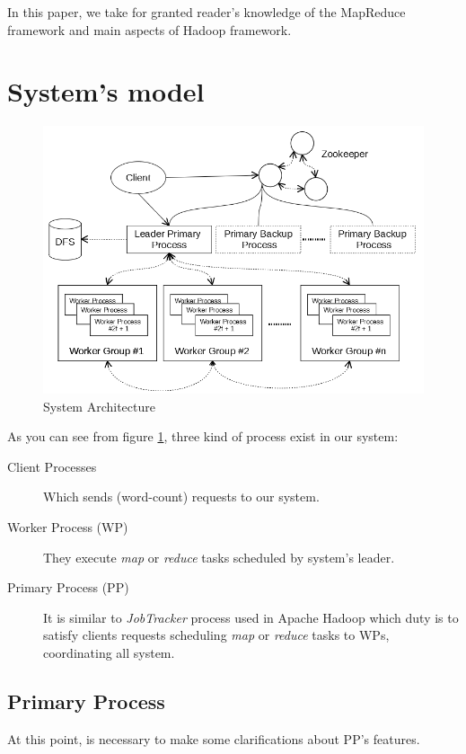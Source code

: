 \documentclass[sigchi]{acmart}
\begin{document}
In this paper, we take for granted reader's knowledge of the MapReduce framework and main aspects of Hadoop  framework.

\section{System's model}

\begin{figure}[h]
  \centering
  \includegraphics[width=\linewidth]{Architecture}
  \caption{System Architecture}
  \label{fig:model}
\end{figure}

As you can see from figure \ref{fig:model}, three kind of process exist in our system:

\begin{description}
\item[Client Processes] Which sends (word-count) requests to our system.

\item[Worker Process (WP)] They execute \textit{map} or \textit{reduce} tasks scheduled by system's leader.

\item[Primary Process (PP)] It is similar to \textit{JobTracker} process used in Apache Hadoop which duty is to satisfy clients requests scheduling \textit{map} or \textit{reduce} tasks to WPs, coordinating all system. 
\end{description}

\subsection{Primary Process}
At this point, is necessary to make some clarifications about PP's features.
\end{document}

